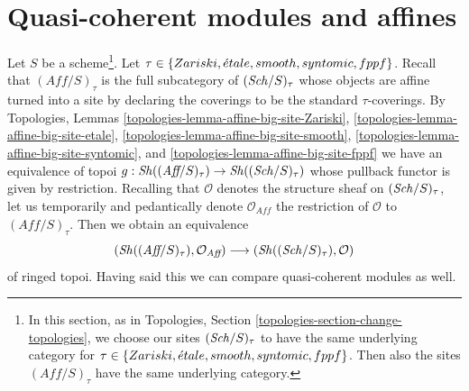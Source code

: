 \section{Quasi-coherent modules and affines}
\label{section-alternative-quasi-coherent}

\noindent
Let $S$ be a scheme\footnote{In this section, as in
Topologies, Section \ref{topologies-section-change-topologies},
we choose our sites $(\mathit{Sch}/S)_\tau$ to have the same underlying category
for $\tau \in \{Zariski, {\acute{e}tale}, smooth, syntomic, fppf\}$. Then also
the sites $(\textit{Aff}/S)_\tau$ have the same underlying category.}.
Let $\tau \in \{Zariski, {\acute{e}tale}, smooth, syntomic, fppf\}$.
Recall that $(\textit{Aff}/S)_\tau$ is the full subcategory
of $(\mathit{Sch}/S)_\tau$ whose objects are affine turned into
a site by declaring the coverings to be the standard $\tau$-coverings.
By Topologies, Lemmas
\ref{topologies-lemma-affine-big-site-Zariski},
\ref{topologies-lemma-affine-big-site-etale},
\ref{topologies-lemma-affine-big-site-smooth},
\ref{topologies-lemma-affine-big-site-syntomic}, and
\ref{topologies-lemma-affine-big-site-fppf}
we have an equivalence of topoi
$g : \mathop{\mathit{Sh}}\nolimits((\textit{Aff}/S)_\tau) \to \mathop{\mathit{Sh}}\nolimits((\mathit{Sch}/S)_\tau)$
whose pullback functor is given by restriction.
Recalling that $\mathcal{O}$ denotes the structure sheaf on
$(\mathit{Sch}/S)_\tau$, let us temporarily and pedantically
denote $\mathcal{O}_{\textit{Aff}}$
the restriction of $\mathcal{O}$ to $(\textit{Aff}/S)_\tau$.
Then we obtain an equivalence
\begin{equation}
\label{equation-alternative-ringed}
(\mathop{\mathit{Sh}}\nolimits((\textit{Aff}/S)_\tau), \mathcal{O}_{\textit{Aff}})
\longrightarrow
(\mathop{\mathit{Sh}}\nolimits((\mathit{Sch}/S)_\tau), \mathcal{O})
\end{equation}
of ringed topoi. Having said this we can compare quasi-coherent modules
as well.

